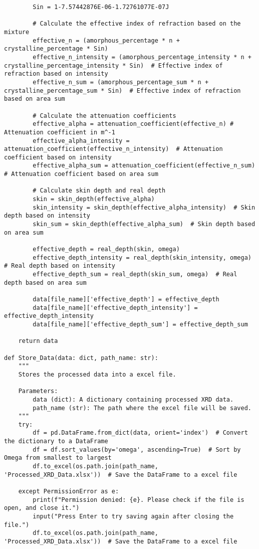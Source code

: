 \begin{small}
\begin{verbatim}
        Sin = 1-7.57442876E-06-1.72761077E-07J

        # Calculate the effective index of refraction based on the mixture
        effective_n = (amorphous_percentage * n + crystalline_percentage * Sin)
        effective_n_intensity = (amorphous_percentage_intensity * n + crystalline_percentage_intensity * Sin)  # Effective index of refraction based on intensity
        effective_n_sum = (amorphous_percentage_sum * n + crystalline_percentage_sum * Sin)  # Effective index of refraction based on area sum

        # Calculate the attenuation coefficients
        effective_alpha = attenuation_coefficient(effective_n) # Attenuation coefficient in m^-1
        effective_alpha_intensity = attenuation_coefficient(effective_n_intensity)  # Attenuation coefficient based on intensity
        effective_alpha_sum = attenuation_coefficient(effective_n_sum)  # Attenuation coefficient based on area sum

        # Calculate skin depth and real depth
        skin = skin_depth(effective_alpha)
        skin_intensity = skin_depth(effective_alpha_intensity)  # Skin depth based on intensity
        skin_sum = skin_depth(effective_alpha_sum)  # Skin depth based on area sum

        effective_depth = real_depth(skin, omega)
        effective_depth_intensity = real_depth(skin_intensity, omega)  # Real depth based on intensity
        effective_depth_sum = real_depth(skin_sum, omega)  # Real depth based on area sum

        data[file_name]['effective_depth'] = effective_depth
        data[file_name]['effective_depth_intensity'] = effective_depth_intensity
        data[file_name]['effective_depth_sum'] = effective_depth_sum

    return data

def Store_Data(data: dict, path_name: str):
    """
    Stores the processed data into a excel file.

    Parameters:
        data (dict): A dictionary containing processed XRD data.
        path_name (str): The path where the excel file will be saved.
    """
    try:
        df = pd.DataFrame.from_dict(data, orient='index')  # Convert the dictionary to a DataFrame
        df = df.sort_values(by='omega', ascending=True)  # Sort by Omega from smallest to largest
        df.to_excel(os.path.join(path_name, 'Processed_XRD_Data.xlsx'))  # Save the DataFrame to a excel file
    
    except PermissionError as e:
        print(f"Permission denied: {e}. Please check if the file is open, and close it.")
        input("Press Enter to try saving again after closing the file.")
        df.to_excel(os.path.join(path_name, 'Processed_XRD_Data.xlsx'))  # Save the DataFrame to a excel file


\end{verbatim}
\end{small}
